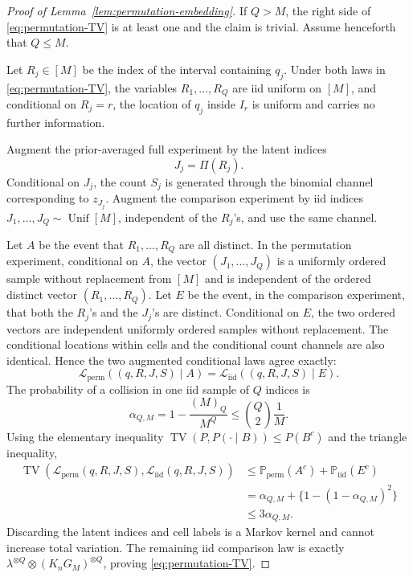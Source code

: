 \documentclass[11pt]{article}
\newcommand\pr{\mathbb P}
\newcommand{\TV}{\operatorname{TV}}
\begin{document}
\begin{proof}[Proof of Lemma~\ref{lem:permutation-embedding}]
If $Q>M$, the right side of \eqref{eq:permutation-TV} is at least one and the claim is trivial.  Assume henceforth that $Q\le M$.

Let $R_j\in[M]$ be the index of the interval containing $q_j$.  Under both laws in \eqref{eq:permutation-TV}, the variables $R_1,\dots,R_Q$ are iid uniform on $[M]$, and conditional on $R_j=r$, the location of $q_j$ inside $I_r$ is uniform and carries no further information.

Augment the prior-averaged full experiment by the latent indices
\[
J_j=\Pi(R_j).
\]
Conditional on $J_j$, the count $S_j$ is generated through the binomial channel corresponding to $z_{J_j}$.  Augment the comparison experiment by iid indices $J_1,\dots,J_Q\sim\operatorname{Unif}[M]$, independent of the $R_j$'s, and use the same channel.

Let $A$ be the event that $R_1,\dots,R_Q$ are all distinct.  In the permutation experiment, conditional on $A$, the vector $(J_1,\dots,J_Q)$ is a uniformly ordered sample without replacement from $[M]$ and is independent of the ordered distinct vector $(R_1,\dots,R_Q)$.  Let $E$ be the event, in the comparison experiment, that both the $R_j$'s and the $J_j$'s are distinct.  Conditional on $E$, the two ordered vectors are independent uniformly ordered samples without replacement.  The conditional locations within cells and the conditional count channels are also identical.  Hence the two augmented conditional laws agree exactly:
\[
\mathcal L_{\mathrm{perm}}((q,R,J,S)\mid A)
=
\mathcal L_{\mathrm{iid}}((q,R,J,S)\mid E).
\]
The probability of a collision in one iid sample of $Q$ indices is
\[
\alpha_{Q,M}
=
1-\frac{(M)_Q}{M^Q}
\le
\binom Q2\frac1M.
\]
Using the elementary inequality $\TV(P,P(\cdot\mid B))\le P(B^c)$ and the triangle inequality,
\begin{align*}
\TV(\mathcal L_{\mathrm{perm}}(q,R,J,S),
     \mathcal L_{\mathrm{iid}}(q,R,J,S))
&\le
\pr_{\mathrm{perm}}(A^c)
+
\pr_{\mathrm{iid}}(E^c)\\
&=
\alpha_{Q,M}
+
\{1-(1-\alpha_{Q,M})^2\}\\
&\le3\alpha_{Q,M}.
\end{align*}
Discarding the latent indices and cell labels is a Markov kernel and cannot increase total variation.  The remaining iid comparison law is exactly $\lambda^{\otimes Q}\otimes(K_nG_M)^{\otimes Q}$, proving \eqref{eq:permutation-TV}.
\end{proof}
\end{document}
